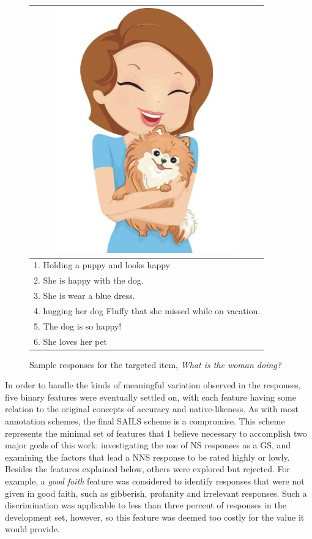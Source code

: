 \begin{figure}[htb!]
\begin{center}
\begin{tabular}{|l|}
\hline
\multicolumn{1}{|c|}{\includegraphics[width=0.45\columnwidth]{figures/I29.jpg}} \\
\hline
1. Holding a puppy and looks happy \\
\hline
2. She is happy with the dog. \\
\hline
3. She is wear a blue dress. \\
\hline
4. hugging her dog Fluffy that she missed while on vacation. \\
\hline
5. The dog is so happy! \\
\hline
6. She loves her pet \\
\hline
\end{tabular}
\caption{\label{fig:sample-responses} Sample responses for the targeted item, \textit{What is the woman doing?}}
\end{center}
\end{figure}

In order to handle the kinds of meaningful variation observed in the responses, five binary features were eventually settled on, with each feature having some relation to the original concepts of accuracy and native-likeness. As with most annotation schemes, the final SAILS scheme is a compromise. This scheme represents the minimal set of features that I believe necessary to accomplish two major goals of this work: investigating the use of NS responses as a GS, and examining the factors that lead a NNS response to be rated highly or lowly. Besides the features explained below, others were explored but rejected. For example, a \textit{good faith} feature was considered to identify responses that were not given in good faith, such as gibberish, profanity and irrelevant responses. Such a discrimination was applicable to less than three percent of responses in the development set, however, so this feature was deemed too costly for the value it would provide.

